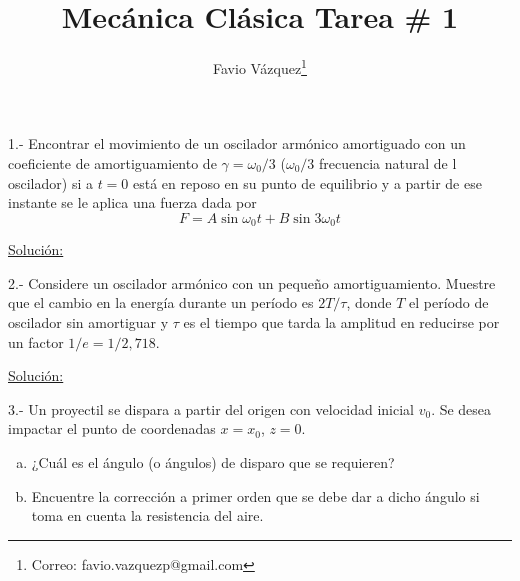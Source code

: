 \documentclass[a4paper,10pt]{article}
\title{Mecánica Clásica Tarea \# 1}
\author{Favio Vázquez\thanks{Correo: favio.vazquezp@gmail.com}}\affil{Instituto de Física. Universidad Nacional Autónoma de México}
\date{}
\begin{document}
\makeatletter
\def\@maketitle{%
  \newpage
  \null
  \vskip 2em%
  \begin{center}%
  \let \footnote \thanks
    {\Large\bfseries \@title \par}%
    \vskip 1.5em%
    {\normalsize
      \lineskip .5em%
      \begin{tabular}[t]{c}%
        \@author
      \end{tabular}\par}%
    \vskip 1em%
    {\normalsize \@date}%
  \end{center}%
  \par
  \vskip 1.5em}
\makeatother

\maketitle

1.- Encontrar el movimiento de un oscilador armónico amortiguado
con un coeficiente de amortiguamiento de $\gamma = \omega_{0}/3$ 
($\omega_{0}/3$ frecuencia natural de l oscilador) si a $t=0$ está 
en reposo en su punto de equilibrio y a partir de ese instante se le
aplica una fuerza dada por $$F=A\sin{\omega_{0}t}+B\sin{3\omega_{0}t}$$

\underline{Solución:}

\vspace{.3cm}

2.- Considere un oscilador armónico con un pequeño amortiguamiento.
Muestre que el cambio en la energía durante un período es $2T/\tau$,
donde $T$ el período de oscilador sin amortiguar y $\tau$ es el tiempo
que tarda la amplitud en reducirse por un factor $1/e=1/2,718$.

\vspace{.3cm}

\underline{Solución:}

\vspace{.3cm}

3.- Un proyectil se dispara a partir del origen con velocidad inicial $v_{0}$.
Se desea impactar el punto de coordenadas $x=x_{0}$, $z=0$.

\begin{enumerate}[a)]
 \item ¿Cuál es el ángulo (o ángulos) de disparo que se requieren?
 \item Encuentre la corrección a primer orden que se debe dar a dicho ángulo si toma 
 en cuenta la resistencia del aire.
\end{enumerate}
\vspace{.3cm}
\end{document}
